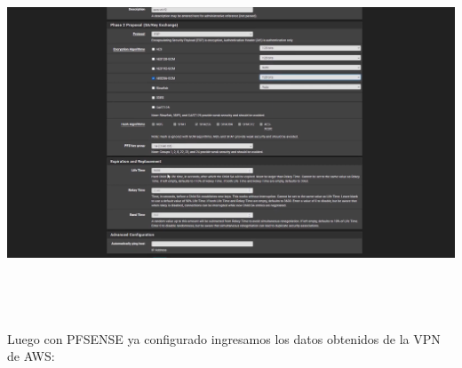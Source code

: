\documentclass{article} %
\begin{document}
\noindent \includegraphics*[width=5.90in, height=4.25in, trim=1.01in 0.00in 0.69in 0.00in]{image29}

\noindent 

\noindent 

\noindent 

\noindent 

\noindent 

\noindent 

\noindent 

\noindent 

\noindent 

\noindent 

\noindent 

\noindent 

\noindent 

\noindent 

\noindent 

\noindent 

\noindent 

\noindent 

\noindent 

\noindent 

\noindent 

\noindent 

\noindent 

\noindent 

\noindent Luego con PFSENSE ya configurado ingresamos los datos obtenidos de la VPN de AWS: 
\end{document}
